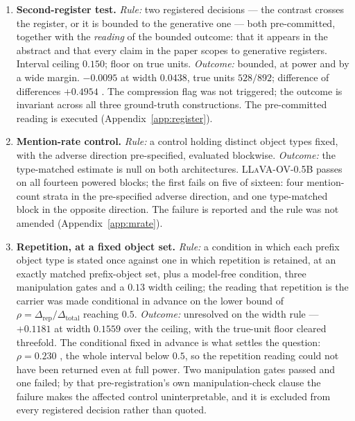 \begin{enumerate}
\item \textbf{Second-register test.}
\emph{Rule:} two registered decisions --- the contrast crosses the register, or it is bounded to the
generative one --- both pre-committed, together with the \emph{reading} of the bounded outcome: that it
appears in the abstract and that every claim in the paper scopes to generative registers. Interval
ceiling $0.150$; floor on true units.
\emph{Outcome:} bounded, at power and by a wide margin. $-0.0095$  at width
$0.0438$, true units $528/892$; difference of differences $+0.4954$ . The
compression flag was not triggered; the outcome is invariant across all three ground-truth constructions. The
pre-committed reading is executed (Appendix~\ref{app:register}).

\item \textbf{Mention-rate control.}
\emph{Rule:} a control holding distinct object types fixed, with the adverse direction pre-specified,
evaluated blockwise.
\emph{Outcome:} the type-matched estimate is null on both architectures. \textsc{LLaVA-OV-0.5B}
passes on all fourteen powered blocks; the first fails on five of sixteen: four mention-count strata
in the pre-specified adverse direction, and one type-matched block in the opposite direction. The failure is reported and the rule was not amended
(Appendix~\ref{app:mrate}).

\item \textbf{Repetition, at a fixed object set.}
\emph{Rule:} a condition in which each prefix object type is stated once against one in which
repetition is retained, at an exactly matched prefix-object set, plus a model-free condition, three
manipulation gates and a $0.13$ width ceiling; the reading that repetition is the carrier was made
conditional in advance on the lower bound of $\rho = \Delta_{\mathrm{rep}}/\Delta_{\mathrm{total}}$
reaching $0.5$.
\emph{Outcome:} unresolved on the width rule --- $+0.1181$  at width $0.1559$
over the ceiling, with the true-unit floor cleared threefold. The conditional fixed in advance is
what settles the question: $\rho = 0.230$ , the whole interval below $0.5$, so the
repetition reading could not have been returned even at full power. Two manipulation gates passed and
one failed; by that pre-registration's own manipulation-check clause the failure makes the affected
control uninterpretable, and it is excluded from every registered decision rather than quoted.


\end{enumerate}
